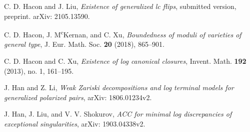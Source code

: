 \documentclass[11pt]{amsart}
\numberwithin{equation}{section}
\theoremstyle{definition}
\theoremstyle{definition}
\theoremstyle{definition}
\begin{document}
\begin{thebibliography}{99}


 C. D. Hacon and J. Liu, \textit{Existence of generalized lc flips}, submitted version, preprint. arXiv: 2105.13590.


 C. D. Hacon, J. M\textsuperscript{c}Kernan, and C. Xu, \textit{Boundedness of moduli of varieties of general type}, J. Eur. Math. Soc. \textbf{20} (2018), 865--901.


 C. D. Hacon and C. Xu, \textit{Existence of log canonical closures}, Invent. Math. \textbf{192} (2013), no. 1, 161--195.


 J. Han and Z. Li, \textit{Weak Zariski decompositions and log terminal models for generalized polarized pairs}, arXiv: 1806.01234v2.




 J. Han, J. Liu, and V. V. Shokurov, \textit{ACC for minimal log discrepancies of exceptional singularities}, arXiv: 1903.04338v2.


\end{thebibliography}
\end{document}
